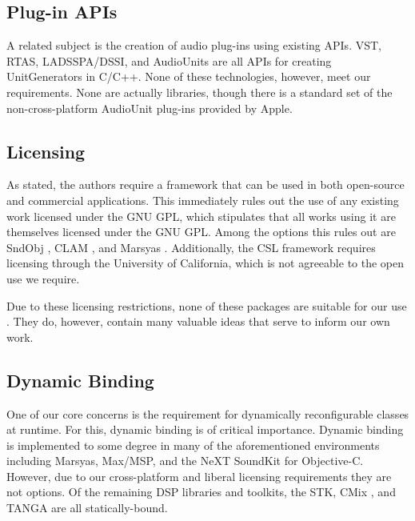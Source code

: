 \documentclass[twoside,10pt]{article}
\begin{document}


\subsection{Plug-in APIs} %

A related subject is the creation of audio plug-ins using existing APIs.  VST, RTAS, LADSSPA/DSSI, and AudioUnits are all APIs for creating UnitGenerators in C/C++.  None of these technologies, however, meet our requirements.  None are actually libraries, though there is a standard set of the non-cross-platform AudioUnit plug-ins provided by Apple.



\subsection{Licensing} %

As stated, the authors require a framework that can be used in both open-source and commercial applications.  This immediately rules out the use of any existing work licensed under the GNU GPL, which stipulates that all works using it are themselves licensed under the GNU GPL.  Among the options this rules out are SndObj \cite{Lazzarini:2001}, CLAM \cite{Amatraian:2008}, and Marsyas \cite{Tzanetakis:2008}.  Additionally, the CSL framework \cite{Pope:2003} requires licensing through the University of California, which is not agreeable to the open use we require.

Due to these licensing restrictions, none of these packages are suitable for our use
.  They do, however, contain many valuable ideas that serve to inform our own work.



\subsection{Dynamic Binding} %

One of our core concerns is the requirement for dynamically reconfigurable classes at runtime.  For this, dynamic binding is of critical importance.  Dynamic binding is implemented to some degree in many of the aforementioned environments including Marsyas, Max/MSP, and the NeXT SoundKit for Objective-C.  However, due to our cross-platform and liberal licensing requirements they are not options.  Of the remaining DSP libraries and toolkits, the STK\cite{Cook:1999}, CMix \cite{Lansky:1990}, and TANGA \cite{Reiter:2007} are all statically-bound.  
\end{document}
